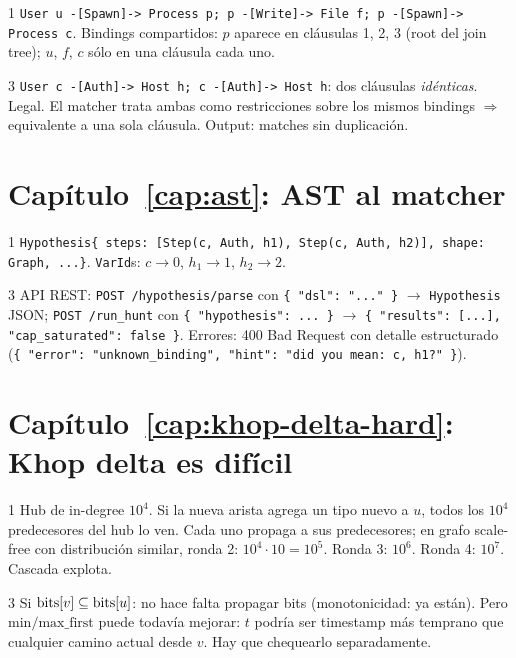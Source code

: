 \begin{solucion}{1}
\texttt{User u -[Spawn]-> Process p; p -[Write]-> File f; p -[Spawn]-> Process c}.
Bindings compartidos: \(p\) aparece en cláusulas 1, 2, 3 (root del
join tree); \(u\), \(f\), \(c\) sólo en una cláusula cada uno.
\end{solucion}

\begin{solucion}{3}
\texttt{User c -[Auth]-> Host h; c -[Auth]-> Host h}: dos cláusulas
\emph{idénticas}. Legal. El matcher trata ambas como restricciones
sobre los mismos bindings $\Rightarrow$ equivalente a una sola
cláusula. Output: matches sin duplicación.
\end{solucion}

\section*{Capítulo~\ref{cap:ast}: AST al matcher}

\begin{solucion}{1}
\texttt{Hypothesis\{ steps: [Step(c, Auth, h1), Step(c, Auth, h2)],
shape: Graph, ...\}}. \texttt{VarId}s: \(c \to 0\), \(h_1 \to 1\),
\(h_2 \to 2\).
\end{solucion}

\begin{solucion}{3}
API REST: \texttt{POST /hypothesis/parse} con
\texttt{\{ "dsl": "..." \}} $\to$ \texttt{Hypothesis} JSON;
\texttt{POST /run\_hunt} con
\texttt{\{ "hypothesis": ... \}} $\to$
\texttt{\{ "results": [...], "cap\_saturated": false \}}. Errores:
400 Bad Request con detalle estructurado (\texttt{\{ "error":
"unknown\_binding", "hint": "did you mean: c, h1?" \}}).
\end{solucion}

\section*{Capítulo~\ref{cap:khop-delta-hard}: Khop delta es difícil}

\begin{solucion}{1}
Hub de in-degree \(10^4\). Si la nueva arista agrega un tipo
nuevo a \(u\), todos los \(10^4\) predecesores del hub lo ven.
Cada uno propaga a sus predecesores; en grafo scale-free con
distribución similar, ronda 2: \(10^4 \cdot 10 = 10^5\). Ronda 3:
\(10^6\). Ronda 4: \(10^7\). Cascada explota.
\end{solucion}

\begin{solucion}{3}
Si \(\mathrm{bits}[v] \subseteq \mathrm{bits}[u]\): no hace falta propagar bits
(monotonicidad: ya están). Pero \(\mathrm{min/max\_first}\) puede
todavía mejorar: \(t\) podría ser timestamp más temprano que
cualquier camino actual desde \(v\). Hay que chequearlo
separadamente.
\end{solucion}


